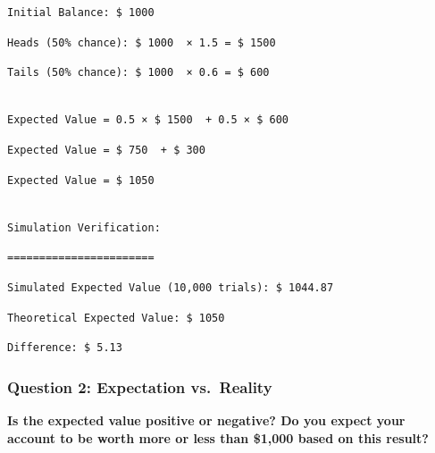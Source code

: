 \documentclass[
  letterpaper,
  DIV=11,
  numbers=noendperiod]{scrartcl}
\theoremstyle{definition}
\theoremstyle{remark}
\begin{document}
\begin{verbatim}
Initial Balance: $ 1000 
\end{verbatim}

\begin{verbatim}
Heads (50% chance): $ 1000  × 1.5 = $ 1500 
\end{verbatim}

\begin{verbatim}
Tails (50% chance): $ 1000  × 0.6 = $ 600 
\end{verbatim}

\begin{verbatim}

Expected Value = 0.5 × $ 1500  + 0.5 × $ 600 
\end{verbatim}

\begin{verbatim}
Expected Value = $ 750  + $ 300 
\end{verbatim}

\begin{verbatim}
Expected Value = $ 1050 
\end{verbatim}

\begin{verbatim}

Simulation Verification:
\end{verbatim}

\begin{verbatim}
=======================
\end{verbatim}

\begin{verbatim}
Simulated Expected Value (10,000 trials): $ 1044.87 
\end{verbatim}

\begin{verbatim}
Theoretical Expected Value: $ 1050 
\end{verbatim}

\begin{verbatim}
Difference: $ 5.13 
\end{verbatim}

\subsubsection{Question 2: Expectation
vs.~Reality}\label{question-2-expectation-vs.-reality}

\textbf{Is the expected value positive or negative? Do you expect your
account to be worth more or less than \$1,000 based on this result?}
\end{document}
